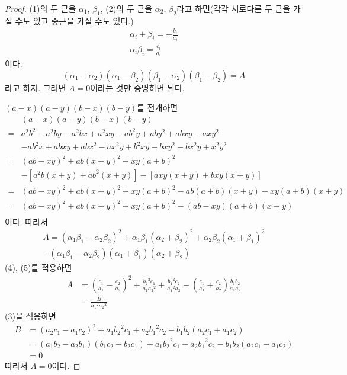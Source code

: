 \documentclass{article}
\newcommand{\ao}{\ensuremath{{\alpha_1}}}
\newcommand{\at}{\ensuremath{{\alpha_2}}}
\newcommand{\bo}{\ensuremath{{\beta_1}}}
\newcommand{\bt}{\ensuremath{{\beta_2}}}
\begin{document}
\begin{proof}
(1)의 두 근을 \(\ao\), \(\bo\), (2)의 두 근을 \(\at\), \(\bt\)라고 하면(각각 서로다른 두 근을 가질 수도 있고 중근을 가질 수도 있다.)
\begin{gather}
\alpha_i+\beta_i=-\frac{b_i}{a_i}\\
\alpha_i\beta_i=\frac{c_i}{a_i}
\end{gather}
이다.
\[(\ao-\at)(\ao-\bt)(\bo-\at)(\bo-\bt)=A\]
라고 하자.
그러면 \(A=0\)이라는 것만 증명하면 된다.

\((a-x)(a-y)(b-x)(b-y)\)를 전개하면
\[
\begin{split}
&(a-x)(a-y)(b-x)(b-y)\\
=&a^2b^2-a^2by-a^2bx+a^2xy-ab^2y+aby^2+abxy-axy^2\\
&-ab^2x+abxy+abx^2-ax^2y+b^2xy-bxy^2-bx^2y+x^2y^2\\
=&(ab-xy)^2+ab(x+y)^2+xy(a+b)^2\\
&-[a^2b(x+y)+ab^2(x+y)]-[axy(x+y)+bxy(x+y)]\\
=&(ab-xy)^2+ab(x+y)^2+xy(a+b)^2-ab(a+b)(x+y)-xy(a+b)(x+y)\\
=&(ab-xy)^2+ab(x+y)^2+xy(a+b)^2-(ab-xy)(a+b)(x+y)\\
\end{split}
\]
이다.
따라서
\begin{multline*}
A=(\ao\bo-\at\bt)^2+\ao\bo(\at+\bt)^2+\at\bt(\ao+\bo)^2\\
-(\ao\bo-\at\bt)(\ao+\bo)(\at+\bt)
\end{multline*}
(4), (5)를 적용하면
\begin{align*}
A
&=\left(\frac{c_1}{a_1}-\frac{c_2}{a_2}\right)^2+\frac{{b_2}^2c_1}{{a_1}{a_2}^2}+\frac{{b_1}^2c_2}{{a_1}^2{a_2}}-\left(\frac{c_1}{a_1}+\frac{c_2}{a_2}\right)\frac{b_1b_2}{a_1a_2}\\
&=\frac{B}{{a_1}^2{a_2}^2}
\end{align*}
(3)을 적용하면
\begin{align*}
B
&=(a_2c_1-a_1c_2)^2+a_1{b_2}^2c_1+a_2{b_1}^2c_2-b_1b_2(a_2c_1+a_1c_2)\\
&=(a_1b_2-a_2b_1)(b_1c_2-b_2c_1)+a_1{b_2}^2c_1+a_2{b_1}^2c_2-b_1b_2(a_2c_1+a_1c_2)\\
&=0
\end{align*}
따라서 \(A=0\)이다.
\end{proof}
\end{document}
